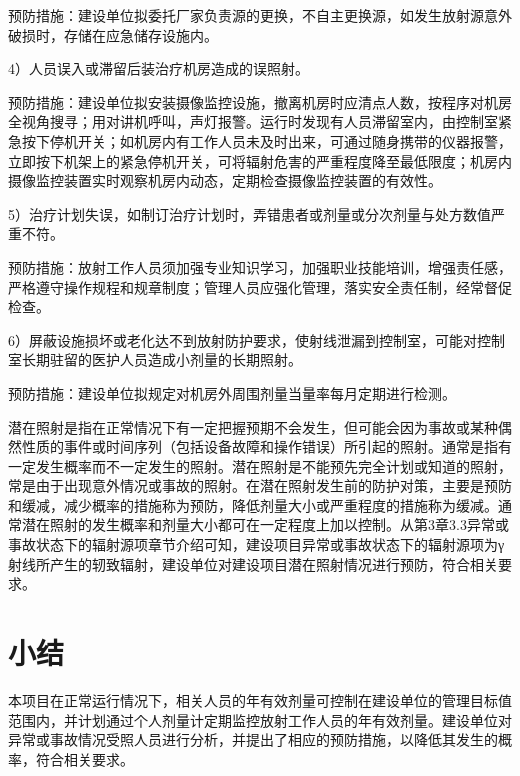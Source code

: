 预防措施：建设单位拟委托厂家负责源的更换，不自主更换源，如发生放射源意外破损时，存储在应急储存设施内。

4）人员误入或滞留后装治疗机房造成的误照射。

预防措施：建设单位拟安装摄像监控设施，撤离机房时应清点人数，按程序对机房全视角搜寻；用对讲机呼叫，声灯报警。运行时发现有人员滞留室内，由控制室紧急按下停机开关；如机房内有工作人员未及时出来，可通过随身携带的仪器报警，立即按下机架上的紧急停机开关，可将辐射危害的严重程度降至最低限度；机房内摄像监控装置实时观察机房内动态，定期检查摄像监控装置的有效性。

5）治疗计划失误，如制订治疗计划时，弄错患者或剂量或分次剂量与处方数值严重不符。

预防措施：放射工作人员须加强专业知识学习，加强职业技能培训，增强责任感，严格遵守操作规程和规章制度；管理人员应强化管理，落实安全责任制，经常督促检查。

6）屏蔽设施损坏或老化达不到放射防护要求，使射线泄漏到控制室，可能对控制室长期驻留的医护人员造成小剂量的长期照射。

预防措施：建设单位拟规定对机房外周围剂量当量率每月定期进行检测。

潜在照射是指在正常情况下有一定把握预期不会发生，但可能会因为事故或某种偶然性质的事件或时间序列（包括设备故障和操作错误）所引起的照射。通常是指有一定发生概率而不一定发生的照射。潜在照射是不能预先完全计划或知道的照射，常是由于出现意外情况或事故的照射。在潜在照射发生前的防护对策，主要是预防和缓减，减少概率的措施称为预防，降低剂量大小或严重程度的措施称为缓减。通常潜在照射的发生概率和剂量大小都可在一定程度上加以控制。从第3章3.3异常或事故状态下的辐射源项章节介绍可知，建设项目异常或事故状态下的辐射源项为γ射线所产生的轫致辐射，建设单位对建设项目潜在照射情况进行预防，符合相关要求。

\section{小结}

本项目在正常运行情况下，相关人员的年有效剂量可控制在建设单位的管理目标值范围内，并计划通过个人剂量计定期监控放射工作人员的年有效剂量。建设单位对异常或事故情况受照人员进行分析，并提出了相应的预防措施，以降低其发生的概率，符合相关要求。
